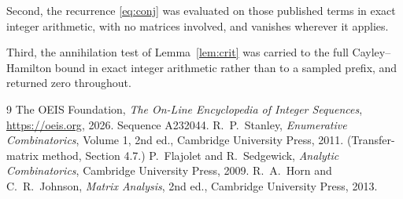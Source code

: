 \documentclass[11pt,a4paper]{article}
\theoremstyle{plain}
\theoremstyle{definition}
\begin{document}
Second, the recurrence \eqref{eq:conj} was evaluated on those published terms in exact
integer arithmetic, with no matrices involved, and vanishes wherever it applies.

Third, the annihilation test of Lemma~\ref{lem:crit} was carried to the full
Cayley--Hamilton bound in exact integer arithmetic rather than to a sampled prefix, and
returned zero throughout.

\begin{thebibliography}{9}
 The OEIS Foundation, \emph{The On-Line Encyclopedia of Integer
Sequences}, \url{https://oeis.org}, 2026. Sequence A232044.
 R.~P.~Stanley, \emph{Enumerative Combinatorics}, Volume 1, 2nd ed.,
Cambridge University Press, 2011. (Transfer-matrix method, Section 4.7.)
 P.~Flajolet and R.~Sedgewick, \emph{Analytic Combinatorics}, Cambridge
University Press, 2009.
 R.~A.~Horn and C.~R.~Johnson, \emph{Matrix Analysis}, 2nd ed., Cambridge
University Press, 2013.
\end{thebibliography}
\end{document}
